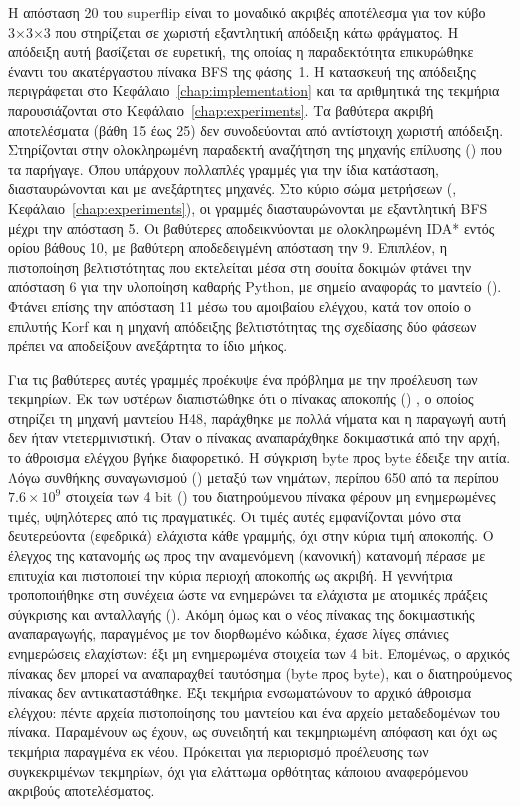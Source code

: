 Η απόσταση 20 του superflip είναι το μοναδικό ακριβές αποτέλεσμα για τον κύβο 3×3×3 που στηρίζεται σε χωριστή εξαντλητική απόδειξη κάτω φράγματος. Η απόδειξη αυτή βασίζεται σε ευρετική, της οποίας η παραδεκτότητα επικυρώθηκε έναντι του ακατέργαστου πίνακα BFS της φάσης~1. Η κατασκευή της απόδειξης περιγράφεται στο Κεφάλαιο~\ref{chap:implementation} και τα αριθμητικά της τεκμήρια παρουσιάζονται στο Κεφάλαιο~\ref{chap:experiments}. Τα βαθύτερα ακριβή αποτελέσματα (βάθη 15 έως 25) δεν συνοδεύονται από αντίστοιχη χωριστή απόδειξη. Στηρίζονται στην ολοκληρωμένη παραδεκτή αναζήτηση της μηχανής επίλυσης () που τα παρήγαγε. Όπου υπάρχουν πολλαπλές γραμμές για την ίδια κατάσταση, διασταυρώνονται και με ανεξάρτητες μηχανές. Στο κύριο σώμα μετρήσεων (, Κεφάλαιο~\ref{chap:experiments}), οι γραμμές  διασταυρώνονται με εξαντλητική BFS μέχρι την απόσταση 5. Οι βαθύτερες αποδεικνύονται με ολοκληρωμένη IDA* εντός ορίου βάθους 10, με βαθύτερη αποδεδειγμένη απόσταση την 9. Επιπλέον, η πιστοποίηση βελτιστότητας που εκτελείται μέσα στη σουίτα δοκιμών φτάνει την απόσταση 6 για την υλοποίηση καθαρής Python, με σημείο αναφοράς το μαντείο (). Φτάνει επίσης την απόσταση 11 μέσω του αμοιβαίου ελέγχου, κατά τον οποίο ο επιλυτής Korf και η μηχανή απόδειξης βελτιστότητας της σχεδίασης δύο φάσεων πρέπει να αποδείξουν ανεξάρτητα το ίδιο μήκος.

Για τις βαθύτερες αυτές γραμμές προέκυψε ένα πρόβλημα με την προέλευση των τεκμηρίων. Εκ των υστέρων διαπιστώθηκε ότι ο πίνακας αποκοπής () , ο οποίος στηρίζει τη μηχανή μαντείου H48, παράχθηκε με πολλά νήματα και η παραγωγή αυτή δεν ήταν ντετερμινιστική. Όταν ο πίνακας αναπαράχθηκε δοκιμαστικά από την αρχή, το άθροισμα ελέγχου βγήκε διαφορετικό. Η σύγκριση byte προς byte έδειξε την αιτία. Λόγω συνθήκης συναγωνισμού () μεταξύ των νημάτων, περίπου 650 από τα περίπου \(7.6\times10^{9}\) στοιχεία των 4 bit () του διατηρούμενου πίνακα φέρουν μη ενημερωμένες τιμές, υψηλότερες από τις πραγματικές. Οι τιμές αυτές εμφανίζονται μόνο στα δευτερεύοντα (εφεδρικά) ελάχιστα κάθε γραμμής, όχι στην κύρια τιμή αποκοπής. Ο έλεγχος της κατανομής ως προς την αναμενόμενη (κανονική) κατανομή πέρασε με επιτυχία και πιστοποιεί την κύρια περιοχή αποκοπής ως ακριβή. Η γεννήτρια τροποποιήθηκε στη συνέχεια ώστε να ενημερώνει τα ελάχιστα με ατομικές πράξεις σύγκρισης και ανταλλαγής (). Ακόμη όμως και ο νέος πίνακας της δοκιμαστικής αναπαραγωγής, παραγμένος με τον διορθωμένο κώδικα, έχασε λίγες σπάνιες ενημερώσεις ελαχίστων: έξι μη ενημερωμένα στοιχεία των 4 bit. Επομένως, ο αρχικός πίνακας δεν μπορεί να αναπαραχθεί ταυτόσημα (byte προς byte), και ο διατηρούμενος πίνακας δεν αντικαταστάθηκε. Έξι τεκμήρια ενσωματώνουν το αρχικό άθροισμα ελέγχου: πέντε αρχεία πιστοποίησης του μαντείου και ένα αρχείο μεταδεδομένων του πίνακα. Παραμένουν ως έχουν, ως συνειδητή και τεκμηριωμένη απόφαση και όχι ως τεκμήρια παραγμένα εκ νέου. Πρόκειται για περιορισμό προέλευσης των συγκεκριμένων τεκμηρίων, όχι για ελάττωμα ορθότητας κάποιου αναφερόμενου ακριβούς αποτελέσματος.

